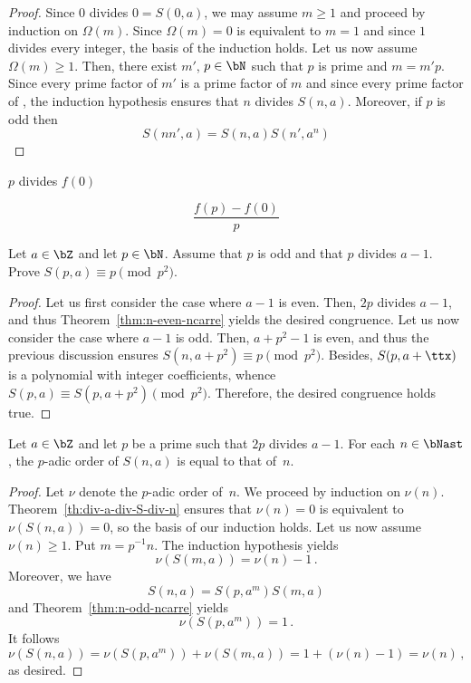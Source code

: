 




\begin{proof}
  Since $0$ divides $0 = S(0, a)$,  we may assume $m \ge 1$ and proceed by induction on $\Omega(m)$.
  Since  $\Omega(m) = 0$ is equivalent to $m = 1$ and since $1$ divides every integer,
  the basis of the induction holds.
  Let us now assume  $\Omega(m) \ge 1$.
  Then, there exist $m'$, $p \in \bN$  such that  $p$ is prime and $m = m' p$.
  Since every prime factor of $m'$ is a prime factor of $m$ and since every prime factor of , the induction hypothesis ensures that $n$ divides $S(n, a)$.
  Moreover, if $p$ is odd then 
  $$
  S(n n', a) = S(n, a) S(n', a^n)
  $$
\end{proof}


$p$ divides $f(0)$

$$
\frac{f(p) - f(0)}{p}
$$


 \begin{exercise}  \label{exo:n-odd-carre}
   Let $a \in \bZ$ and let $p \in \bN$.
   Assume that $p$ is odd and that $p$ divides $a  - 1$.
   Prove $S(p, a) \equiv p \pmod {p^2}$.
 \end{exercise}
 
 \begin{proof}
   Let us first consider the case where $a - 1$ is even.
   Then, $2p$ divides $a - 1$, and thus Theorem~\ref{thm:n-even-ncarre} yields the desired congruence.
   Let us now consider the case where $a - 1$ is odd.
   Then, $a + p^2 - 1$ is even, and thus the previous discussion ensures $S(n, a + p^2) \equiv p \pmod {p^2}$.
   Besides, $S(p, a + \ttx)$ is a polynomial with integer coefficients,
   whence $S(p, a) \equiv S(p, a + p^2) \pmod{p^2}$.
   Therefore, the desired congruence  holds true.
 \end{proof}
 

 \begin{theorem} \label{thm:2p-p-adic}
   Let $a \in \bZ$ and let $p$ be a prime such that $2p$ divides $a - 1$.
   For each $n \in \bNast$, the $p$-adic order of $S(n, a)$ is equal to that of~$n$.
 \end{theorem}

 \begin{proof}
   Let $\nu$ denote the $p$-adic order of~$n$.
   We proceed by induction on $\nu(n)$.
   Theorem~\ref{th:div-a-div-S-div-n} ensures that $\nu(n) = 0$ is equivalent to  $\nu(S(n, a)) = 0$,
   so the basis of our induction holds.
   Let us now assume $\nu(n) \ge 1$.
   Put $m =  p^{-1} n$.
   The induction hypothesis yields
   $$
   \nu(S(m, a)) = \nu(n) - 1 \, .
   $$
   Moreover, we have 
   $$
   S(n, a) = S(p, a^m) S(m, a) 
   $$
   and Theorem~\ref{thm:n-odd-ncarre} yields 
   $$\nu(S(p, a^m)) = 1 \, .$$
   It follows
   $$
   \nu(S(n, a))
   = \nu(S(p, a^m)) + \nu(S(m, a))
   = 1 + (\nu(n) - 1)
   = \nu(n) \,, 
   $$
   as desired.  
 \end{proof}


